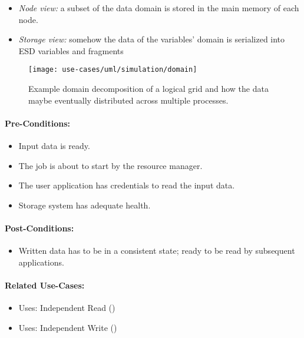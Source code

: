 \begin{itemize}
	\item \emph{Node view:} a subset of the data domain is stored in the main memory of each node.
	\item \emph{Storage view:} somehow the data of the variables' domain is serialized into ESD variables and fragments
\end{itemize}

\begin{figure}
	\centering
	\texttt{[image: use-cases/uml/simulation/domain]}
	\caption{Example domain decomposition of a logical grid and how the data maybe eventually distributed across multiple processes.}
	\label{fig:domain simulation}
\end{figure}



\paragraph{Pre-Conditions:}

\begin{itemize}
	\item Input data is ready.
	\item The job is about to start by the resource manager.
	\item The user application has credentials to read the input data.
	\item Storage system has adequate health.
\end{itemize}


\paragraph{Post-Conditions:}
\begin{itemize}
	\item Written data has to be in a consistent state; ready to be read by subsequent applications.
\end{itemize}


\paragraph{Related Use-Cases:}
\begin{itemize}
	\item Uses: Independent Read ()
	\item Uses: Independent Write ()
\end{itemize}

